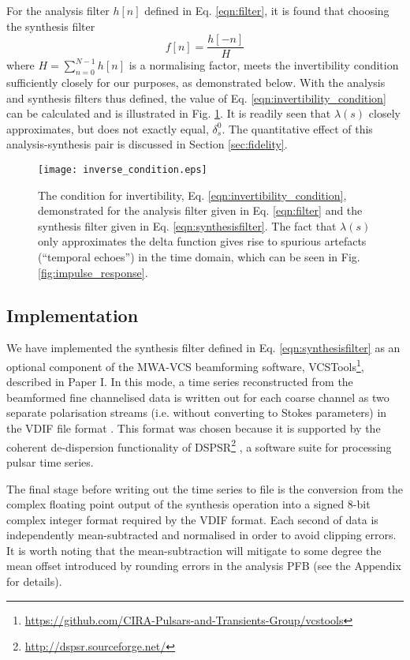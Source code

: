 \documentclass{pasa}%
\newcommand{\PaperI}{Paper I\nocite{Ord2019}}
\newcommand{\Kron}{\delta_s^0}
\newcommand{\vcstools}{VCSTools}
\begin{document}
For the analysis filter $h[n]$ defined in Eq. \eqref{eqn:filter}, it is found that choosing the synthesis filter
\begin{equation}
    f[n] = \frac{h[-n]}{H}
    \label{eqn:synthesisfilter}
\end{equation}
where $H = \sum_{n=0}^{N-1} h[n]$ is a normalising factor, meets the invertibility condition sufficiently closely for our purposes, as demonstrated below.
With the analysis and synthesis filters thus defined, the value of Eq. \eqref{eqn:invertibility_condition} can be calculated and is illustrated in Fig. \ref{fig:inverse_condition}.
It is readily seen that $\lambda(s)$ closely approximates, but does not exactly equal, $\Kron$.
The quantitative effect of this analysis-synthesis pair is discussed in Section \ref{sec:fidelity}.
\begin{figure}
    \centering
    \texttt{[image: inverse\_condition.eps]}
    \caption{The condition for invertibility, Eq. \eqref{eqn:invertibility_condition}, demonstrated for the analysis filter given in Eq. \eqref{eqn:filter} and the synthesis filter given in Eq. \eqref{eqn:synthesisfilter}. The fact that $\lambda(s)$ only approximates the delta function gives rise to spurious artefacts (``temporal echoes'') in the time domain, which can be seen in Fig. \ref{fig:impulse_response}.}
    \label{fig:inverse_condition}
\end{figure}

\subsection{Implementation}

We have implemented the synthesis filter defined in Eq. \eqref{eqn:synthesisfilter} as an optional component of the MWA-VCS beamforming software, \vcstools{}\footnote{\url{https://github.com/CIRA-Pulsars-and-Transients-Group/vcstools}}, described in \PaperI{}.
In this mode, a time series reconstructed from the beamformed fine channelised data is written out for each coarse channel as two separate polarisation streams (i.e. without converting to Stokes parameters) in the VDIF file format \citep{Whitney2009}.
This format was chosen because it is supported by the coherent de-dispersion functionality of DSPSR\footnote{\url{http://dspsr.sourceforge.net/}} \citep{VanStraten2011b}, a software suite for processing pulsar time series.

The final stage before writing out the time series to file is the conversion from the complex floating point output of the synthesis operation into a signed 8-bit complex integer format required by the VDIF format.
Each second of data is independently mean-subtracted and normalised in order to avoid clipping errors.
It is worth noting that the mean-subtraction will mitigate to some degree the mean offset introduced by rounding errors in the analysis PFB (see the Appendix for details).
\end{document}
